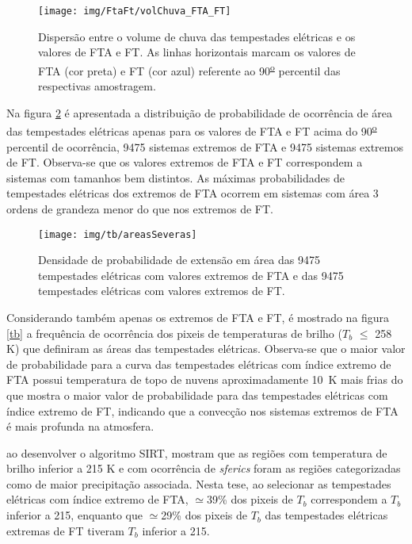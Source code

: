 \begin{figure}[!hb]
  \centering 
  \texttt{[image: img/FtaFt/volChuva\_FTA\_FT]}
  \caption{Dispersão entre o volume de chuva das tempestades elétricas e os valores de FTA e FT.  As linhas horizontais marcam os valores de FTA (cor preta) e FT (cor azul) referente ao 90\textsuperscript{\underline{o}} percentil das respectivas amostragem.}
  \label{volchuvaFTAFT}
\end{figure}


Na figura \ref{size} é apresentada a distribuição de probabilidade de ocorrência de área das tempestades elétricas apenas para os valores de FTA e FT acima do 90\textsuperscript{\underline{o}} percentil de ocorrência, 9475 sistemas extremos de FTA e 9475 sistemas extremos de FT. Observa-se que os valores extremos de FTA e FT correspondem a sistemas com tamanhos bem distintos. As máximas probabilidades de tempestades elétricas dos extremos de FTA ocorrem em sistemas com área 3 ordens de grandeza menor do que nos extremos de FT.


\begin{figure}[!ht]
  \centering
  \texttt{[image: img/tb/areasSeveras]}   
  \caption{Densidade de probabilidade de extensão em área das 9475 tempestades elétricas com valores extremos de FTA  e das 9475 tempestades elétricas com valores extremos de FT.}
  \label{size}  
\end{figure}

Considerando também apenas os extremos de FTA e FT, é mostrado na figura \ref{tb} a frequência de ocorrência dos pixeis de temperaturas de brilho ($T_b$ $\leq$ 258 K) que definiram as áreas das tempestades elétricas. Observa-se que o maior valor de probabilidade para a curva das tempestades elétricas com índice extremo de FTA possui temperatura de topo de nuvens aproximadamente 10~K mais frias do que mostra o maior valor de probabilidade para das tempestades elétricas com índice extremo de FT, indicando que a  convecção nos sistemas extremos de FTA é mais profunda na atmosfera.

 ao desenvolver o algoritmo  SIRT, mostram que as regiões com temperatura de brilho inferior a 215 K e com ocorrência de \textit{sferics} foram as regiões categorizadas como de maior precipitação associada. Nesta tese, ao selecionar as tempestades elétricas com índice extremo de FTA, $\simeq$39\% dos pixeis de $T_b$ correspondem a $T_b$ inferior a 215, enquanto que $\simeq$29\% dos pixeis de $T_b$ das tempestades elétricas extremas de FT tiveram $T_b$ inferior a 215.      

